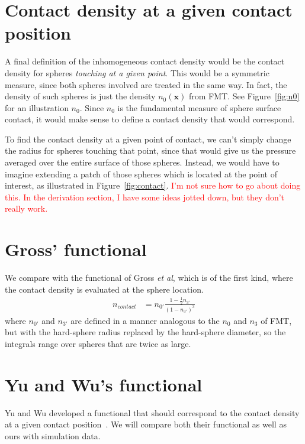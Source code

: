 \documentclass[letterpaper,twocolumn,amsmath,amssymb,prb]{revtex4-1}
\newcommand{\xx}{\textbf{x}}
\begin{document}
\section{Contact density at a given contact position}

A final definition of the inhomogeneous contact density would be the
contact density for spheres \emph{touching at a given point}.  This
would be a symmetric measure, since both spheres involved are treated
in the same way.  In fact, the density of such spheres is just the
density $n_0(\xx)$ from FMT.  See Figure~\ref{fig:n0} for an
illustration $n_0$.  Since $n_0$ is the fundamental measure of sphere
surface contact, it would make sense to define a contact density that
would correspond.

To find the contact density at a given point of contact, we can't
simply change the radius for spheres touching that point, since that
would give us the pressure averaged over the entire surface of those
spheres.  Instead, we would have to imagine extending a patch of those
spheres which is located at the point of interest, as illustrated in
Figure~\ref{fig:contact}.  \textcolor{red}{I'm not sure how to go
  about doing this.  In the derivation section, I have some ideas
  jotted down, but they don't really work.}

\section{Gross' functional}\label{sec:gross}
We compare with the functional of Gross \emph{et
  al}\cite{gross2009density}, which is of the first kind, where the
contact density is evaluated at the sphere location.
\begin{align}
  n_\textit{contact} &= n_{0'} \frac{1 - \frac12 n_{3'}}{\left(1 - n_{3'}\right)^3}
\end{align}
where $n_{0'}$ and $n_{3'}$ are defined in a manner analogous to the
$n_0$ and $n_3$ of FMT, but with the hard-sphere radius replaced by
the hard-sphere diameter, so the integrals range over spheres that are
twice as large.

\section{Yu and Wu's functional}\label{sec:yuwu}

Yu and Wu developed a functional that should correspond to the contact
density at a given contact
position~\cite{yu2002fmt-dft-inhomogeneous-associating}.  We will
compare both their functional as well as ours with simulation data.
\end{document}

